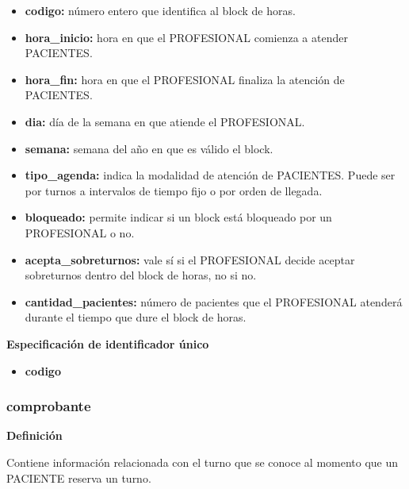 \documentclass[a4paper,11pt]{article}
\begin{document}
\begin{itemize}

     \item \textbf{codigo:} número entero que identifica al block de horas.

     \item \textbf{hora\_inicio:} hora en que el PROFESIONAL comienza a atender PACIENTES.

     \item \textbf{hora\_fin:} hora en que el PROFESIONAL finaliza la atención de PACIENTES.

     \item \textbf{dia:} día de la semana en que atiende el PROFESIONAL.

     \item \textbf{semana:} semana del año en que es válido el block.

     \item \textbf{tipo\_agenda:} indica la modalidad de atención de PACIENTES. Puede ser por 
     turnos a intervalos de tiempo fijo o por orden de llegada.

     \item \textbf{bloqueado:} permite indicar si un block está bloqueado por un PROFESIONAL o 
     no.

     \item \textbf{acepta\_sobreturnos:} vale sí si el PROFESIONAL decide aceptar sobreturnos dentro 
     del block de horas, no si no.

     \item \textbf{cantidad\_pacientes:} número de pacientes que el PROFESIONAL atenderá durante 
     el tiempo que dure el block de horas.

\end{itemize}

\textbf{Especificación de identificador único}

\begin{itemize}

     \item \textbf{codigo}

\end{itemize}

\subsubsection{\textbf{comprobante}}

\textbf{Definición}

Contiene información relacionada con el turno que se conoce al momento que un 
PACIENTE reserva un turno.
\end{document}
